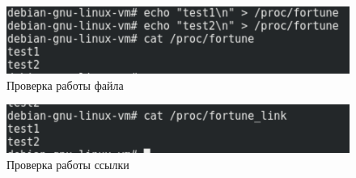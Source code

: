 \begin{figure}[H]
    \centering
    \includegraphics{img/part_02/test_file.png}
    \caption{Проверка работы файла}
\end{figure}

\begin{figure}[H]
    \centering
    \includegraphics{img/part_02/test_link.png}
    \caption{Проверка работы ссылки}
\end{figure}
